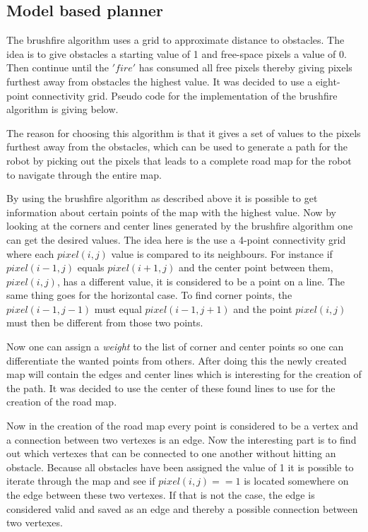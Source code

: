 \documentclass[../Head/Main.tex]{subfiles}
\begin{document}
\subsection{Model based planner}
The brushfire algorithm uses a grid to approximate distance to obstacles. The idea is to give obstacles a starting value of 1 and free-space pixels a value of 0. Then continue until the $'fire'$ has consumed all free pixels thereby giving pixels furthest away from obstacles the highest value. It was decided to use a eight-point connectivity grid. Pseudo code for the implementation of the brushfire algorithm is giving below. \par

The reason for choosing this algorithm is that it gives a set of values to the pixels furthest away from the obstacles, which can be used to generate a path for the robot by picking out the pixels that leads to a complete road map for the robot to navigate through the entire map. \par
By using the brushfire algorithm as described above it is possible to get information about certain points of the map with the highest value. Now by looking at the corners and center lines generated by the brushfire algorithm one can get the desired values. The idea here is the use a 4-point connectivity grid where each $pixel(i,j)$ value is compared to its neighbours. For instance if $pixel(i-1,j)$ equals $pixel(i+1,j)$ and the center point between them, $pixel(i,j)$, has a different value, it is considered to be a point on a line. The same thing goes for the horizontal case. To find corner points, the $pixel(i-1,j-1)$ must equal $pixel(i-1,j+1)$ and the point $pixel(i,j)$ must then be different from those two points. \par

Now one can assign a \textit{weight} to the list of corner and center points so one can differentiate the wanted points from others. After doing this the newly created map will contain the edges and center lines which is interesting for the creation of the path. It was decided to use the center of these found lines to use for the creation of the road map.  

Now in the creation of the road map every point is considered to be a vertex and a connection between two vertexes is an edge. Now the interesting part is to find out which vertexes that can be connected to one another without hitting an obstacle. Because all obstacles have been assigned the value of 1 it is possible to iterate through the map and see if $pixel(i,j) == 1$ is located somewhere on the edge between these two vertexes. If that is not the case, the edge is considered valid and saved as an edge and thereby a possible connection between two vertexes. \par
\end{document}
